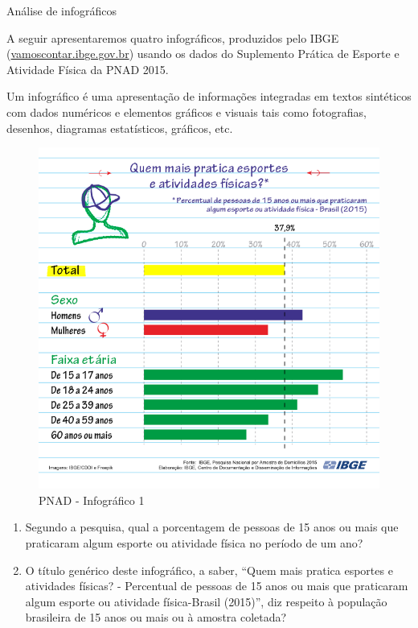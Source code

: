 \label{est1-ativ-4}
\begin{task}{ Análise de infográficos}

A seguir apresentaremos quatro infográficos, produzidos pelo IBGE (\href{https://vamoscontar.ibge.gov.br/atividades/ensino-medio/9801-pesquisando-a-pratica-de-esportes-e-atividades-fisicas-no-brasil.html}{vamoscontar.ibge.gov.br}) usando os dados do Suplemento Prática de Esporte e Atividade Física da PNAD 2015.

Um infográfico é uma apresentação de informações integradas em textos sintéticos com dados numéricos e elementos gráficos e visuais tais como fotografias, desenhos, diagramas estatísticos, gráficos, etc.

\begin{figure}[H]
\centering
\capstart

\noindent\includegraphics[width=300bp]{PNAD_2015_Esportes_01quem2.png}
\caption{PNAD - Infográfico 1}\label{est1-fig-2}\end{figure}
\begin{enumerate}
\item {} 
Segundo a pesquisa, qual a porcentagem de pessoas de 15 anos ou mais que praticaram algum esporte ou atividade física no período de um ano?

\item {} 
O título genérico deste infográfico, a saber, ``Quem mais pratica esportes e atividades físicas? - Percentual de pessoas de 15 anos ou mais que praticaram algum esporte ou atividade física-Brasil (2015)'', diz respeito à população brasileira de 15 anos ou mais ou à amostra coletada?


\end{enumerate}
\end{task}
